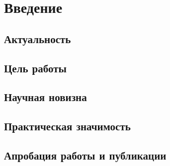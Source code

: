 \chapter*{Введение}



\section*{Актуальность}
\Actuality

\section*{Цель работы}
\Objective

\section*{Научная новизна}
\Novelty

\section*{Практическая значимость}
\PracticalValue

\section*{Апробация работы и публикации}
\Pub